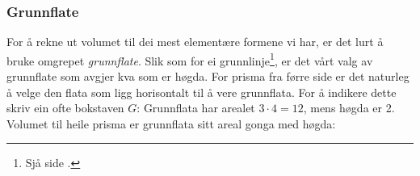 \subsubsection{Grunnflate}
For å rekne ut volumet til dei mest elementære formene vi har, er det lurt å bruke omgrepet \textit{grunnflate}. Slik som for ei grunnlinje\footnote{Sjå side \pageref{grunnlinje}.}, er det vårt valg av grunnflate som avgjer kva som er høgda. For prisma fra førre side er det naturleg å velge den flata som ligg horisontalt til å vere grunnflata. For å indikere dette skriv ein ofte bokstaven $ G $:
Grunnflata har arealet $ 3\cdot4=12 $, mens høgda er 2. Volumet til heile prisma er grunnflata sitt areal gonga med høgda:






